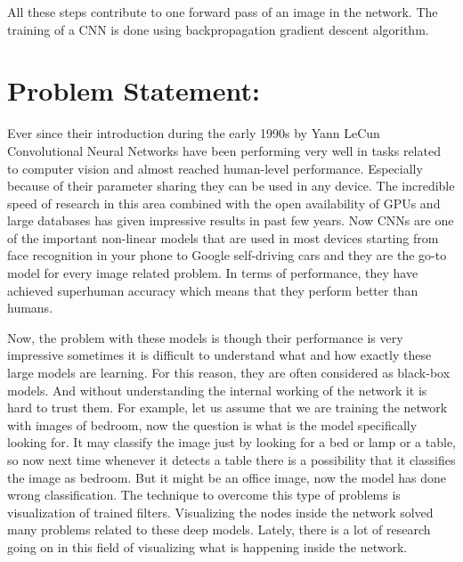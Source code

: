     All these steps contribute to one forward pass of an image in the network. The training of a CNN is done using backpropagation gradient descent algorithm.
  
  
  \section{Problem Statement:}
   Ever since their introduction during the early 1990s by Yann LeCun\cite{lecun} Convolutional Neural Networks have been performing very well in tasks related to computer vision and almost reached human-level performance. Especially because of their parameter sharing they can be used in any device. The incredible speed of research in this area combined with the open availability of GPUs and large databases has given impressive results in past few years. Now CNNs are one of the important non-linear models that are used in most devices starting from face recognition in your phone to Google self-driving cars\cite{Al-Qizwini} and they are the go-to model for every image related problem. In terms of performance, they have achieved superhuman accuracy which means that they perform better than humans. 
   
\noindent   Now, the problem with these models is though their performance is very impressive sometimes it is difficult to understand what and how exactly these large models are learning. For this reason, they are often considered as black-box models. And without understanding the internal working of the network it is hard to trust them. For example, let us assume that we are training the network with images of bedroom, now the question is what is the model specifically looking for. It may classify the image just by looking for a bed or lamp or a table, so now next time whenever it detects a table there is a possibility that it classifies the image as bedroom. But it might be an office image, now the model has done wrong classification. The technique to overcome this type of problems is visualization of trained filters. Visualizing the nodes inside the network solved many problems related to these deep models. Lately, there is a lot of research going on in this field of visualizing what is happening inside the network.
